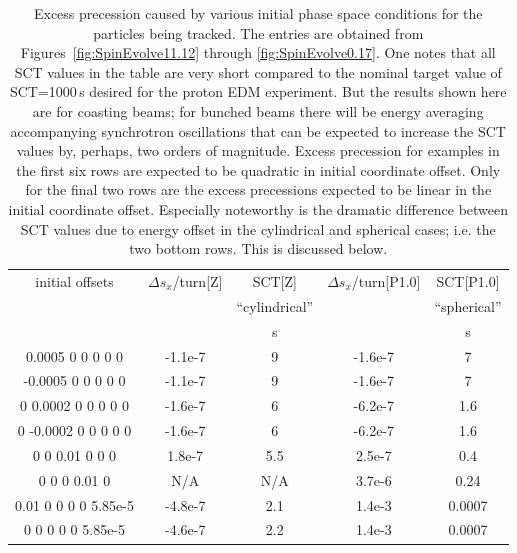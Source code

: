 \documentclass[]{article}
\begin{document}
\begin{table}[h]
\caption{\label{tbl:ExcessPrecessions}Excess precession caused by various
initial phase space conditions for the particles being tracked. The entries
are obtained from Figures~\ref{fig:SpinEvolve11.12} through 
\ref{fig:SpinEvolve0.17}. One notes that all SCT values in the table are 
very short compared to
the nominal target value of SCT=1000\,s desired for the proton EDM experiment.
But the results shown here are for coasting beams; for bunched beams there 
will be energy averaging accompanying synchrotron oscillations 
that can be expected to increase the SCT values by, perhaps,
two orders of magnitude. Excess precession for examples in the 
first six rows are expected to be quadratic in initial coordinate
offset. Only for the final two rows are
the excess precessions expected to be linear in the initial
coordinate offset. 
Especially noteworthy is the dramatic difference between SCT values
due to energy offset in the cylindrical and spherical cases; i.e. the two 
bottom rows. This is discussed below.
} 
\medskip
\centering
\begin{tabular}{|c|c|c|c|c|}           \hline
initial offsets       & $\Delta s_x$/turn[Z] & SCT[Z] & $\Delta s_x$/turn[P1.0] & SCT[P1.0] \\
                      &                      & ``cylindrical'' &         & ``spherical''    \\
                      &                      &      s      &             &   s  \\ \hline
%
 0.0005 0 0 0 0 0     &    -1.1e-7           &   9         &    -1.6e-7  &   7      \\
-0.0005 0 0 0 0 0     &    -1.1e-7           &   9         &    -1.6e-7  &   7      \\
 0  0.0002 0 0 0 0 0  &    -1.6e-7           &   6         &    -6.2e-7  &  1.6      \\
 0 -0.0002 0 0 0 0 0  &    -1.6e-7           &   6         &    -6.2e-7  &  1.6     \\
 0 0 0.01 0 0 0       &     1.8e-7           &  5.5        &     2.5e-7  &  0.4     \\
 0 0 0 0.01 0         &     N/A              &  N/A        &     3.7e-6  &  0.24    \\ \hline
 0.01 0 0 0 0 5.85e-5 &    -4.8e-7           &  2.1        &     1.4e-3  &  0.0007  \\
 0 0 0 0 0 5.85e-5    &    -4.6e-7           &  2.2        &     1.4e-3  &  0.0007  \\
\hline
\end{tabular}
\end{table}
%
\end{document}
